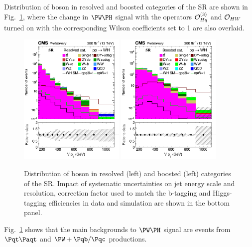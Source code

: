 \documentclass[a4paper,11pt]{article}
\newcommand{\Pb}{{{\Pqb}}\xspace}
\newcommand{\Pt}{{{\Pqt}}\xspace}
\newcommand{\Pc}{{{\Pqc}}\xspace}
\newcommand{\PAt}{{{{\Paqt}}}\xspace}
\begin{document}
Distribution of \PW boson \pt in resolved and boosted categories of the SR are shown in Fig.~\ref{fig:RECO_Vpt_WH}, where the change in $\PW\PH$ signal with the operators ${\cal O}^{(3)}_{Hq}$ and ${\cal O}_{HW}$ turned on with the corresponding Wilson coefficients set to 1 are also overlaid. 
\begin{figure}[hbtp]
\begin{center}
\includegraphics[width=0.45\textwidth]{Figures/RECO/Plot_Resolved_SR_V_pt.png}
\includegraphics[width=0.45\textwidth]{Figures/RECO/Plot_Boosted_SR_V_pt.png}
\end{center}
\caption{
Distribution of \PW boson \pt in resolved (left) and boosted (left) categories of the SR. Impact of systematic uncertainties on jet energy scale and resolution, correction factor used to match the b-tagging and Higgs-tagging efficiencies in data and simulation are shown in the bottom panel.
}
\label{fig:RECO_Vpt_WH}
\end{figure}
Fig.~\ref{fig:RECO_Vpt_WH} shows that the main backgrounds to $\PW\PH$ signal are events from $\Pt\PAt$ and ${\PW}+\Pb/\Pc$ productions.
\end{document}
